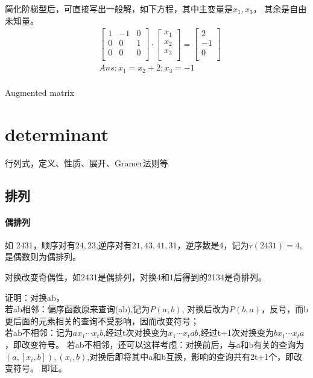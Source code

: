 \documentclass[UTF8]{../../09-Mathematics}
\begin{document}
简化阶梯型后，可直接写出一般解，如下方程，其中主变量是$x_1, x_3$， 其余是自由未知量。
\begin{equation}
    \begin{split}
    & \begin{bmatrix}
            1 & -1 & 0\\
            0 & 0 & 1\\
            0 & 0 & 0\\
        \end{bmatrix}
        \cdot
        \begin{bmatrix}
            x_1 \\
            x_2 \\
            x_3\\
        \end{bmatrix}
        =
        \begin{bmatrix}
        2 \\
        -1 \\
        0 \\
        \end{bmatrix} \\
        &Ans: x_1 = x_2 + 2; x_3 = -1\\
    \end{split}
\end{equation}

Augmented matrix



\section{determinant}
行列式，定义、性质、展开、Gramer法则等


\subsection{排列}

\paragraph{偶排列}

如 2431，顺序对有${24,23}$,逆序对有${21,43,41,31}$，逆序数是4，记为$\tau(2431) = 4 $,是偶数则为偶排列。

\begin{lemma}
    对换改变奇偶性，如2431是偶排列，对换4和1后得到的2134是奇排列。

    证明：对换ab，\\
    若ab相邻：偏序函数原来查询(ab),记为$P(a,b)$, 对换后改为$P(b,a)$，反号，而b更后面的元素相关的查询不受影响，因而改变符号；\\
    若ab不相邻：记为$a x_1 \cdots x_t b$,经过t次对换变为$ x_1 \cdots x_ta b$,经过t+1次对换变为$ bx_1 \cdots x_ta $，即改变符号。
    若ab不相邻，还可以这样考虑：对换前后，与a和b有关的查询为$(a,[x_i, b]), (x_i,b)$,对换后即将其中a和b互换，影响的查询共有2t+1个，即改变符号。
    即证。
\end{lemma}
\end{document}
